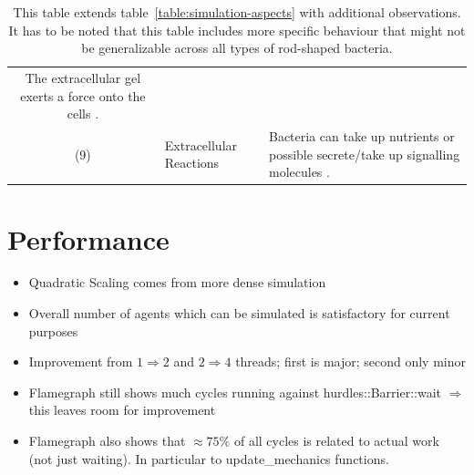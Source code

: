 \documentclass{article}
\begin{document}
\begin{table}[H]
\begin{tabularx}{\textwidth}{c l X}
            The extracellular gel exerts a force onto the cells \cite{Grant2014}.\\
        (9) & Extracellular Reactions &
            Bacteria can take up nutrients or possible secrete/take up signalling molecules
            \cite{Li2025}.\\
        \bottomrule
    \end{tabularx}
    \label{table:simulation-aspects-supplement}
    \caption{
        This table extends table~\ref{table:simulation-aspects} with additional observations.
        It has to be noted that this table includes more specific behaviour that might not be
        generalizable across all types of rod-shaped bacteria.
    }
\end{table}

\section{Performance}

\begin{itemize}
    \item Quadratic Scaling comes from more dense simulation
    \item Overall number of agents which can be simulated is satisfactory for current purposes
    \item Improvement from $1 \Rightarrow 2$ and $2\Rightarrow4$ threads; first is major; second
        only minor
    \item Flamegraph still shows much cycles running against hurdles::Barrier::wait $\Rightarrow$
        this leaves room for improvement
    \item Flamegraph also shows that $\approx 75\%$ of all cycles is related to actual work (not
        just waiting).
        In particular to update\_mechanics functions.
\end{itemize}
\end{document}
